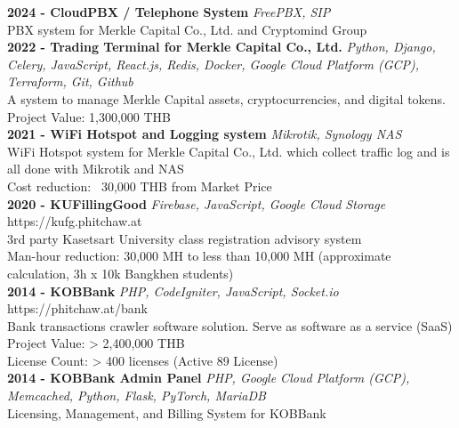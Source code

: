 {\textbf{2024 - CloudPBX / Telephone System}} {\sl FreePBX, SIP} \\
PBX system for Merkle Capital Co., Ltd. and Cryptomind Group \\
\vspace*{2mm}
{\textbf{2022 - Trading Terminal for Merkle Capital Co., Ltd.}} {\sl Python, Django, Celery, JavaScript, React.js, Redis, Docker, Google Cloud Platform (GCP), Terraform, Git, Github} \\
A system to manage Merkle Capital assets, cryptocurrencies, and digital tokens.\\
Project Value: 1,300,000 THB\\
\vspace*{2mm}
{\textbf{2021 - WiFi Hotspot and Logging system}} {\sl Mikrotik, Synology NAS} \\
WiFi Hotspot system for Merkle Capital Co., Ltd. which collect traffic log and is all done with Mikrotik and NAS\\
Cost reduction: ~30,000 THB from Market Price\\
\vspace*{2mm}
{\textbf{2020 - KUFillingGood}} {\sl Firebase, JavaScript, Google Cloud Storage} \hfill https://kufg.phitchaw.at\\
3rd party Kasetsart University class registration advisory system\\
Man-hour reduction: 30,000 MH to less than 10,000 MH (approximate calculation, 3h x 10k Bangkhen students)\\
\vspace*{2mm}
{\textbf{2014 - KOBBank}} {\sl PHP, CodeIgniter, JavaScript, Socket.io} \hfill https://phitchaw.at/bank\\
Bank transactions crawler software solution. Serve as software as a service (SaaS)\\
Project Value: > 2,400,000 THB\\
License Count: > 400 licenses (Active 89 License)\\
\vspace*{2mm}
{\textbf{2014 - KOBBank Admin Panel}} {\sl PHP, Google Cloud Platform (GCP), Memcached, Python, Flask, PyTorch, MariaDB} \\
Licensing, Management, and Billing System for KOBBank\\
\vspace{2mm}

